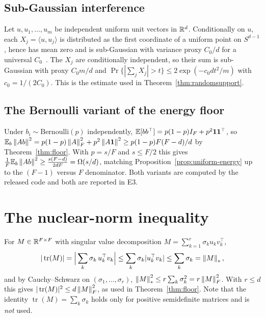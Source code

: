 \subsection{Sub-Gaussian interference}

Let $u,u_1,\dots,u_m$ be independent uniform unit vectors in $\mathbb{R}^d$. Conditionally on $u$, each
$X_j=\langle u,u_j\rangle$ is distributed as the first coordinate of a uniform point on
$S^{d-1}$, hence has mean zero and is sub-Gaussian with variance proxy $C_0/d$ for a universal
$C_0$~\cite[Thm.~3.4.6]{vershynin2018hdp}. The $X_j$ are conditionally independent, so their
sum is sub-Gaussian with proxy $C_0m/d$ and
$\Pr\{|\sum_j X_j|>t\}\le2\exp(-c_0dt^2/m)$ with $c_0=1/(2C_0)$. This is the estimate used in
Theorem~\ref{thm:randomsupport}.

\subsection{The Bernoulli variant of the energy floor}

Under $b_i\sim\mathrm{Bernoulli}(p)$ independently,
$\mathbb{E}[bb^{\top}]=p(1-p)I_F+p^2\mathbf 1\mathbf 1^{\top}$, so
$\mathbb{E}_b\left\lVert Ab \right\rVert^2=p(1-p)\left\lVert A \right\rVert_F^2+p^2\left\lVert A\mathbf 1 \right\rVert^2\ge p(1-p)F(F-d)/d$ by
Theorem~\ref{thm:floor}. With $p=s/F$ and $s\le F/2$ this gives
$\frac1F\mathbb{E}_b\left\lVert Ab \right\rVert^2\ge\frac{s(F-d)}{2dF}=\Omega(s/d)$, matching
Proposition~\ref{prop:uniform-energy} up to the $(F-1)$ versus $F$ denominator. Both variants
are computed by the released code and both are reported in E3.

\section{The nuclear-norm inequality}
\label{app:nuclear}

For $M\in\mathbb{R}^{F\times F}$ with singular value decomposition
$M=\sum_{k=1}^{r}\sigma_k u_k v_k^{\top}$,
\[
  |\operatorname{tr}(M)|=\Big|\sum_k\sigma_k\,u_k^{\top}v_k\Big|
  \le\sum_k\sigma_k|u_k^{\top}v_k|\le\sum_k\sigma_k=\left\lVert M \right\rVert_*,
\]
and by Cauchy--Schwarz on $(\sigma_1,\dots,\sigma_r)$,
$\left\lVert M \right\rVert_*^2\le r\sum_k\sigma_k^2=r\left\lVert M \right\rVert_F^2$. With $r\le d$ this gives
$|\operatorname{tr}(M)|^2\le d\left\lVert M \right\rVert_F^2$, as used in Theorem~\ref{thm:floor}. Note that the
identity $\operatorname{tr}(M)=\sum_k\sigma_k$ holds only for positive semidefinite matrices and
is \emph{not} used.

